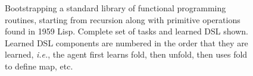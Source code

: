 \documentclass{article}
\begin{document}
\begin{figure}
\begin{tabular}{ll}
    \\\bottomrule 
    \end{tabular}
  \caption{Bootstrapping a standard library of functional programming routines, starting from recursion along with primitive operations found in 1959 Lisp. Complete set of tasks and learned DSL shown. Learned DSL components are numbered in the order that they are learned, \emph{i.e.}, the agent first learns fold, then unfold, then uses fold to define map, etc.}\label{learningFromScratch}
  \end{figure}



\end{document}
